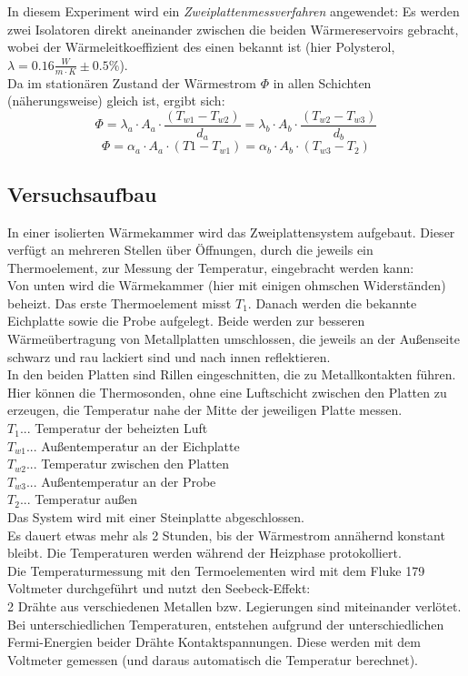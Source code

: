 \documentclass[12pt,a4paper]{article}
\begin{document}
\begin{multicols}{2}
\noindent In diesem Experiment wird ein \emph{Zweiplattenmessverfahren} angewendet: Es werden zwei Isolatoren direkt aneinander zwischen die beiden Wärmereservoirs gebracht, wobei der Wärmeleitkoeffizient des einen bekannt ist (hier Polysterol, $\lambda = 0.16 \frac{W}{m \cdot K}\pm 0.5\%$).\\
Da im stationären Zustand der Wärmestrom $\Phi$ in allen Schichten (näherungsweise) gleich ist, ergibt sich:
$$\Phi=\lambda_a \cdot A_a \cdot \frac{(T_{w1}-T_{w2})}{d_a}=\lambda_b \cdot A_b \cdot \frac{(T_{w2}-T_{w3})}{d_b}$$
$$\Phi = \alpha_a \cdot A_a \cdot (T1-T_{w1}) = \alpha_b \cdot A_b \cdot (T_{w3}-T_2) $$


\subsection{Versuchsaufbau}
In einer isolierten Wärmekammer wird das Zweiplattensystem aufgebaut. Dieser verfügt an mehreren Stellen über Öffnungen, durch die jeweils ein Thermoelement, zur Messung der Temperatur, eingebracht werden kann:\\
Von unten wird die Wärmekammer (hier mit einigen ohmschen Widerständen) beheizt. Das erste Thermoelement misst $T_1$.
Danach werden die bekannte Eichplatte sowie die Probe aufgelegt. Beide werden zur besseren Wärmeübertragung von Metallplatten umschlossen, die jeweils an der Außenseite schwarz und rau lackiert sind und nach innen reflektieren.\\
In den beiden Platten sind Rillen eingeschnitten, die zu Metallkontakten führen. Hier können die Thermosonden, ohne eine Luftschicht zwischen den Platten zu erzeugen, die Temperatur nahe der Mitte der jeweiligen Platte messen.\\

\noindent  $T_1$... Temperatur der beheizten Luft\\
$T_{w1}$... Außentemperatur an der Eichplatte\\
$T_{w2}$... Temperatur zwischen den Platten\\
$T_{w3}$... Außentemperatur an der Probe\\
$T_2$... Temperatur außen\\

\noindent Das System wird mit einer Steinplatte abgeschlossen.\\
Es dauert etwas mehr als 2 Stunden, bis der Wärmestrom annähernd konstant bleibt. Die Temperaturen werden während der Heizphase protokolliert.\\

\noindent Die Temperaturmessung mit den Termoelementen wird mit dem Fluke 179 Voltmeter durchgeführt und nutzt den Seebeck-Effekt:\\
2 Drähte aus verschiedenen Metallen bzw. Legierungen sind miteinander verlötet. Bei unterschiedlichen Temperaturen, entstehen aufgrund der unterschiedlichen Fermi-Energien beider Drähte Kontaktspannungen. Diese werden mit dem Voltmeter gemessen (und daraus automatisch die Temperatur berechnet).

\end{multicols}
\end{document}
